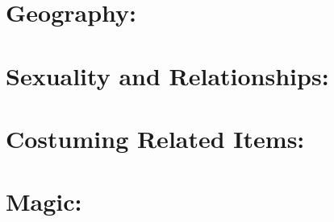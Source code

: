 \documentclass[blue]{GL2020}
\begin{document}
\section{Geography:}

\section{Sexuality and Relationships:}

\section{Costuming Related Items:}

\section{Magic:}
\end{document}
